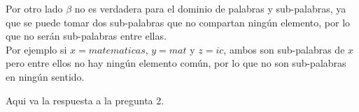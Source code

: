 \documentclass[letter]{article}
\begin{document}
\begin{pregunta}{1}
\begin{enumerate}
		Por otro lado $\beta$ no es verdadera para el dominio de palabras y sub-palabras, ya que se puede tomar dos sub-palabras que no compartan ningún elemento, por lo que no serán sub-palabras entre ellas.\\
		Por ejemplo si $x = matematicas $, $y = mat$ y $ z = ic$, ambos son sub-palabras de $x$ pero entre ellos no hay ningún elemento común, por lo que no son sub-palabras en ningún sentido.
		\end{enumerate}
	\end{pregunta}
	
	\begin{pregunta}{2}
		Aqui va la respuesta a la pregunta 2.
		
	\end{pregunta}
\end{document}
